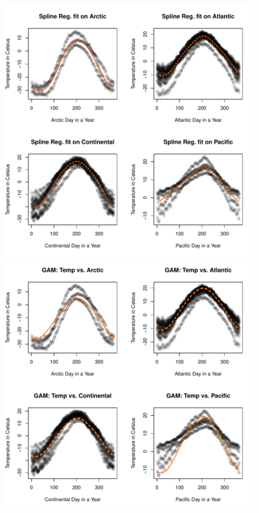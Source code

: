 \documentclass[aoas]{imsart}\usepackage[]{graphicx}\usepackage[]{xcolor}
\newenvironment{knitrout}{}{} %
\begin{document}
\begin{knitrout}
\color{fgcolor}

{\centering \includegraphics[width=1.01\linewidth,height=0.53\textheight]{figure/unnamed-chunk-5-1} 
\includegraphics[width=1.01\linewidth,height=0.53\textheight]{figure/unnamed-chunk-5-2} 

}


\end{knitrout}
\end{document}
